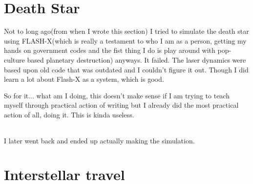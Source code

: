 \section{Death Star}
\par Not to long ago(from when I wrote this section) I tried to simulate the death star using FLASH-X(which is really a testament to who I am as a person, getting my hands on government codes and the fist thing I do is play around with pop-culture based planetary destruction) anyways. It failed. The laser dynamics were based upon old code that was outdated and I couldn't figure it out. Though I did learn a lot about Flash-X as a system, which is good.
\par So for it... what am I doing, this doesn't make sense if I am trying to teach myself through practical action of writing but I already did the most practical action of all, doing it. This is kinda useless.
\\
\\
\par I later went back and ended up actually making the simulation.

\section{Interstellar travel}
